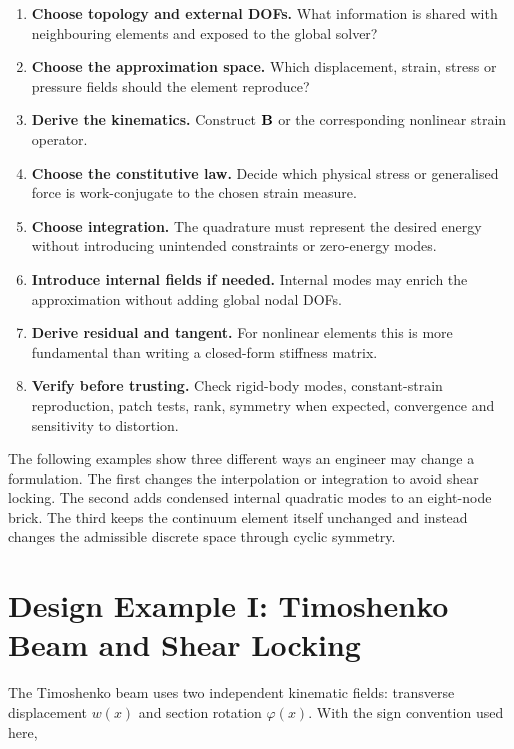 \begin{enumerate}
    \item \textbf{Choose topology and external DOFs.} What information is shared
          with neighbouring elements and exposed to the global solver?
    \item \textbf{Choose the approximation space.} Which displacement, strain,
          stress or pressure fields should the element reproduce?
    \item \textbf{Derive the kinematics.} Construct $\mathbf{B}$ or the corresponding
          nonlinear strain operator.
    \item \textbf{Choose the constitutive law.} Decide which physical stress or
          generalised force is work-conjugate to the chosen strain measure.
    \item \textbf{Choose integration.} The quadrature must represent the desired
          energy without introducing unintended constraints or zero-energy modes.
    \item \textbf{Introduce internal fields if needed.} Internal modes may enrich
          the approximation without adding global nodal DOFs.
    \item \textbf{Derive residual and tangent.} For nonlinear elements this is
          more fundamental than writing a closed-form stiffness matrix.
    \item \textbf{Verify before trusting.} Check rigid-body modes, constant-strain
          reproduction, patch tests, rank, symmetry when expected, convergence
          and sensitivity to distortion.
\end{enumerate}

The following examples show three different ways an engineer may change a
formulation. The first changes the interpolation or integration to avoid shear
locking. The second adds condensed internal quadratic modes to an eight-node
brick. The third keeps the continuum element itself unchanged and instead
changes the admissible discrete space through cyclic symmetry.

\section[Timoshenko Beam and Shear Locking]{Design Example I: Timoshenko Beam and Shear Locking}

The Timoshenko beam uses two independent kinematic fields: transverse
displacement $w(x)$ and section rotation $\varphi(x)$. With the sign convention
used here,

